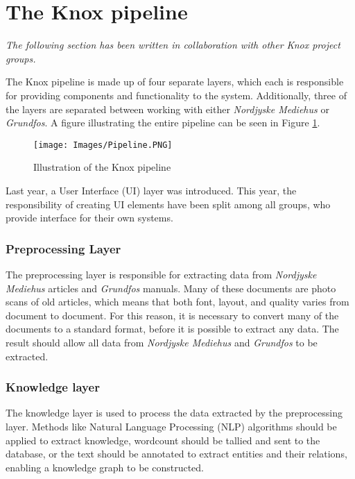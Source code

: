 \section{The Knox pipeline}\label{the_knox_pipeline}
\textit{The following section has been written in collaboration with other Knox project groups.}


The Knox pipeline is made up of four separate layers, which each is responsible for providing components and functionality to the system.
 Additionally, three of the layers are separated between working with either \textit{Nordjyske Mediehus} or \textit{Grundfos}.
  A figure illustrating the entire pipeline can be seen in Figure \ref{fig:pipeline}.

\begin{figure}[h]
    \centering
    \texttt{[image: Images/Pipeline.PNG]}
    \caption{Illustration of the Knox pipeline\label{fig:pipeline}}
\end{figure}

Last year, a User Interface (UI) layer was introduced. This year, the responsibility of creating UI elements have been split among all groups, who provide interface for their own systems.

\subsubsection{Preprocessing Layer}
The preprocessing layer is responsible for extracting data from \textit{Nordjyske Mediehus} articles and \textit{Grundfos} manuals. Many of these documents are photo scans of old articles, which means that both font, layout, and quality varies from document to document. For this reason, it is necessary to convert many of the documents to a standard format, before it is possible to extract any data. The result should allow all data from \textit{Nordjyske Mediehus} and \textit{Grundfos} to be extracted. 

\subsubsection{Knowledge layer}
The knowledge layer is used to process the data extracted by the preprocessing layer. Methods like Natural Language Processing (NLP) algorithms should be applied to extract knowledge, wordcount should be tallied and sent to the database, or the text should be annotated to extract entities and their relations, enabling a knowledge graph to be constructed.

